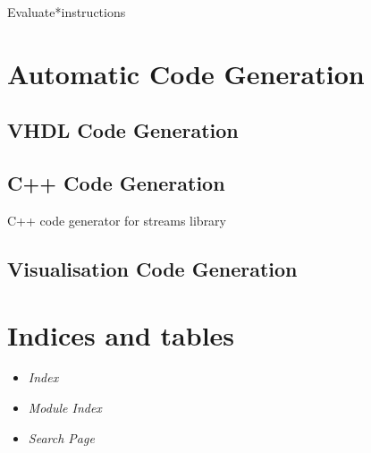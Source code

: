\documentclass[letterpaper,10pt,english]{manual}
\begin{document}
\hypertarget{streams.Evaluate}{}\begin{classdesc}{Evaluate}{*instructions}\end{classdesc}

\resetcurrentobjects
\hypertarget{--doc-automatic\_code\_generation/index}{}

\chapter{Automatic Code Generation}


\section{VHDL Code Generation}


\section{C++ Code Generation}
\hypertarget{module-streams\_cpp}{}
\modulesynopsis{}
C++ code generator for streams library


\section{Visualisation Code Generation}


\chapter{Indices and tables}
\begin{itemize}
\item {} 
\emph{Index}

\item {} 
\emph{Module Index}

\item {} 
\emph{Search Page}

\end{itemize}


\renewcommand{\indexname}{Module Index}
\printmodindex
\renewcommand{\indexname}{Index}
\printindex
\end{document}
